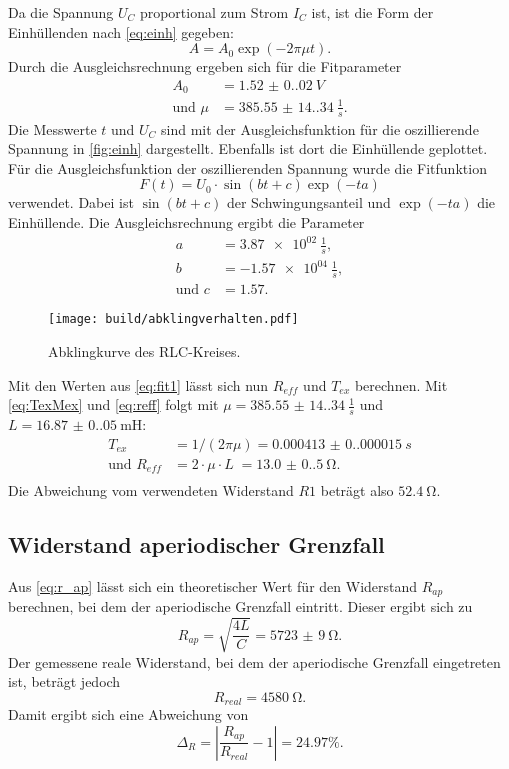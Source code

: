Da die Spannung $U_C$ proportional zum Strom $I_C$ ist, ist die Form der Einhüllenden nach \autoref{eq:einh} gegeben:
\begin{equation*}
  A = A_0 \exp(-2 \pi \mu t).
\end{equation*}
Durch die Ausgleichsrechnung ergeben sich für die Fitparameter
\begin{align}
  A_0 &= \SI{1.52(0.02)}{V} \\
  \text{und } \mu &= \SI{385.55(14.34)}{\frac{1}{s}}.
  \label{eq:fit1}
\end{align}
Die Messwerte $t$ und $U_C$ sind mit der Ausgleichsfunktion für die oszillierende Spannung in \autoref{fig:einh} dargestellt. Ebenfalls ist dort die Einhüllende
geplottet.
Für die Ausgleichsfunktion der oszillierenden Spannung wurde die Fitfunktion
\begin{equation*}
  F(t) = U_0 \cdot \sin(bt+c) \exp(-ta)
\end{equation*}
verwendet. Dabei ist $\sin(bt+c)$ der Schwingungsanteil und $\exp(-ta)$ die Einhüllende. 
Die Ausgleichsrechnung ergibt die Parameter
\begin{align*}
  a &= \SI{3.87e02}{\frac{1}{s}},\\
  b &= \SI{-1.57e04}{\frac{1}{s}},\\
  \text{und } c &= \SI{1.57}.
\end{align*}
\begin{figure}[H]
  \texttt{[image: build/abklingverhalten.pdf]}
  \caption{Abklingkurve des RLC-Kreises.}
  \label{fig:einh}
\end{figure}
Mit den Werten aus \autoref{eq:fit1} lässt sich nun $R_{eff}$ und $T_{ex}$ berechnen. Mit \autoref{eq:TexMex} und \autoref{eq:reff} folgt mit 
$\mu = \SI{385.55(14.34)}{\frac{1}{s}}$ und $L = \SI{16.87(0.05)}{\milli\henry}$:
\begin{align*}
  T_{ex} &= 1/(2\pi\mu)                      = \SI{0.000413(0.000015)}{s}\\
  \text{und } R_{eff} &= 2 \cdot \mu \cdot L \; = \SI{13.0(0.5)}{\ohm}.\\
\end{align*}
Die Abweichung vom verwendeten Widerstand $R1$ beträgt also $\SI{52.4}{\ohm}$.

\subsection{Widerstand aperiodischer Grenzfall}\label{sec:ap}
Aus \autoref{eq:r_ap} lässt sich ein theoretischer Wert für den Widerstand $R_{ap}$ berechnen, bei dem der aperiodische Grenzfall eintritt.
Dieser ergibt sich zu
\begin{equation*}
  R_{ap} = \sqrt{\frac{4L}{C}} = \SI{5723(9)}{\ohm}.
\end{equation*}
Der gemessene reale Widerstand, bei dem der aperiodische Grenzfall eingetreten ist, beträgt jedoch
\begin{equation*}
  R_{real} = \SI{4580}{\ohm}.
\end{equation*}
Damit ergibt sich eine Abweichung von
\begin{equation*}
  \Delta_R = |\frac{R_{ap}}{R_{real}} - 1| = 24.97\%.
\end{equation*}

